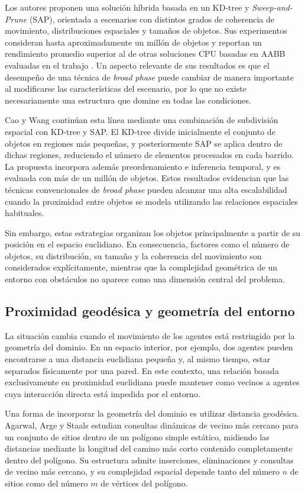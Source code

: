 \documentclass[12pt]{article}
\begin{document}
Los autores proponen una solución híbrida basada en un KD-tree y \textit{Sweep-and-Prune} (SAP), orientada a escenarios con distintos grados de coherencia de movimiento, distribuciones espaciales y tamaños de objetos. Sus experimentos consideran hasta aproximadamente un millón de objetos y reportan un rendimiento promedio superior al de otras soluciones CPU basadas en AABB evaluadas en el trabajo \cite{serpa2019flexible}. Un aspecto relevante de sus resultados es que el desempeño de una técnica de \textit{broad phase} puede cambiar de manera importante al modificarse las características del escenario, por lo que no existe necesariamente una estructura que domine en todas las condiciones.

Cao y Wang \cite{cao2023fast} continúan esta línea mediante una combinación de subdivisión espacial con KD-tree y SAP. El KD-tree divide inicialmente el conjunto de objetos en regiones más pequeñas, y posteriormente SAP se aplica dentro de dichas regiones, reduciendo el número de elementos procesados en cada barrido. La propuesta incorpora además preordenamiento e inferencia temporal, y es evaluada con más de un millón de objetos. Estos resultados evidencian que las técnicas convencionales de \textit{broad phase} pueden alcanzar una alta escalabilidad cuando la proximidad entre objetos se modela utilizando las relaciones espaciales habituales.

Sin embargo, estas estrategias organizan los objetos principalmente a partir de su posición en el espacio euclidiano. En consecuencia, factores como el número de objetos, su distribución, su tamaño y la coherencia del movimiento son considerados explícitamente, mientras que la complejidad geométrica de un entorno con obstáculos no aparece como una dimensión central del problema.

\subsection{Proximidad geodésica y geometría del entorno}

La situación cambia cuando el movimiento de los agentes está restringido por la geometría del dominio. En un espacio interior, por ejemplo, dos agentes pueden encontrarse a una distancia euclidiana pequeña y, al mismo tiempo, estar separados físicamente por una pared. En este contexto, una relación basada exclusivamente en proximidad euclidiana puede mantener como vecinos a agentes cuya interacción directa está impedida por el entorno.

Una forma de incorporar la geometría del dominio es utilizar distancia geodésica. Agarwal, Arge y Staals \cite{agarwal2018dynamic} estudian consultas dinámicas de vecino más cercano para un conjunto de sitios dentro de un polígono simple estático, midiendo las distancias mediante la longitud del camino más corto contenido completamente dentro del polígono. Su estructura admite inserciones, eliminaciones y consultas de vecino más cercano, y su complejidad espacial depende tanto del número \(n\) de sitios como del número \(m\) de vértices del polígono.
\end{document}
